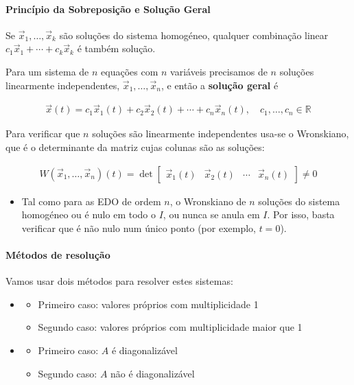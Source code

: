 \documentclass{article}
\begin{document}
\paragraph{Princípio da Sobreposição e Solução Geral}

Se $\vec{x}_1, \ldots, \vec{x}_k$ são soluções do sistema homogéneo, qualquer combinação linear
$c_1 \vec{x}_1 + \cdots + c_k \vec{x}_k$ é também solução.

Para um sistema de $n$ equações com $n$ variáveis precisamos de $n$ soluções linearmente independentes,
$\vec{x}_1, \ldots, \vec{x}_n$, e então a \textbf{solução geral} é

\begin{gather*}
\boxed{\vec{x}(t) = c_1 \vec{x}_1(t) + c_2 \vec{x}_2(t) + \cdots + c_n \vec{x}_n(t),
\quad c_1, \ldots, c_n \in \mathbb{R}}
\end{gather*}

Para verificar que $n$ soluções são linearmente independentes usa-se o Wronskiano, que é o determinante
da matriz cujas colunas são as soluções:

\begin{gather*}
W(\vec{x}_1, \ldots, \vec{x}_n)(t) =
\det
\begin{bmatrix}
\vec{x}_1(t) & \vec{x}_2(t) & \cdots & \vec{x}_n(t)
\end{bmatrix}
\neq 0
\end{gather*}

\begin{itemize}
    \item Tal como para as EDO de ordem $n$, o Wronskiano de $n$ soluções do sistema homogéneo ou é nulo em
    todo o $I$, ou nunca se anula em $I$. Por isso, basta verificar que é não nulo num único ponto
    (por exemplo, $t = 0$).
\end{itemize}

\paragraph{Métodos de resolução}

Vamos usar dois métodos para resolver estes sistemas:

\begin{itemize}
    \item \textbf{}
    \begin{itemize}
        \item Primeiro caso: valores próprios com multiplicidade 1
        \item Segundo caso: valores próprios com multiplicidade maior que 1
    \end{itemize}
    \item \textbf{}
    \begin{itemize}
        \item Primeiro caso: $A$ é diagonalizável
        \item Segundo caso: $A$ não é diagonalizável
    \end{itemize}
\end{itemize}
\end{document}
